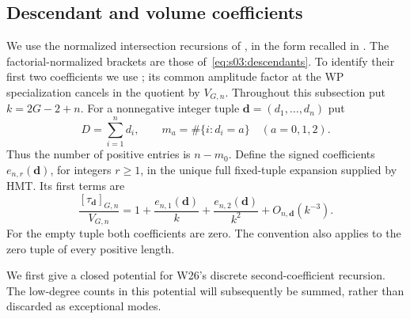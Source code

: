 \subsection{Descendant and volume coefficients}
\label{subsec:a:01}

We use the normalized intersection recursions of
\cite[Section~2]{MZ15}, in the form recalled in
\cite[Theorem~4.3]{HMT25}. The factorial-normalized brackets are those
of~\eqref{eq:s03:descendants}. To identify their first two coefficients
we use \cite[Lemma~7.2 and Appendix~C.1]{W26}; its common amplitude
factor at the WP specialization cancels in the quotient by $V_{G,n}$.
Throughout this subsection put $k=2G-2+n$. For a nonnegative integer
tuple $\mathbf d=(d_1,\ldots,d_n)$ put
\[
 D=\sum_{i=1}^n d_i,\qquad
 m_a=\#\{i:d_i=a\}\quad(a=0,1,2).
\]
Thus the number of positive entries is $n-m_0$. Define the signed
coefficients $e_{n,r}(\mathbf d)$, for integers $r\geq1$, in the
unique full fixed-tuple expansion supplied by HMT. Its first terms are
\begin{equation}\label{eq:a:profile-definition}
 \frac{[\tau_{\mathbf d}]_{G,n}}{V_{G,n}}
 =1+\frac{e_{n,1}(\mathbf d)}k
     +\frac{e_{n,2}(\mathbf d)}{k^2}+O_{n,\mathbf d}(k^{-3}).
\end{equation}
For the empty tuple both coefficients are zero. The convention also
applies to the zero tuple of every positive length.

We first give a closed potential for W26's discrete second-coefficient
recursion. The low-degree counts in this potential will subsequently be
summed, rather than discarded as exceptional modes.

